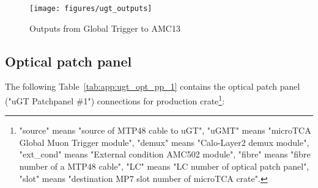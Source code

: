 \begin{figure}[htb]
\centering
\texttt{[image: figures/ugt\_outputs]}
\caption{Outputs from Global Trigger to AMC13}
\label{fig:app:ugt_outputs}
\end{figure}

\clearpage

\subsection{Optical patch panel}\label{sec:app:app_d}

The following Table~\ref{tab:app:ugt_opt_pp_1} contains the optical patch panel ("uGT Patchpanel \#1") connections for production crate\footnote{"source" means "source of MTP48 cable to uGT", "uGMT" means "microTCA Global Muon Trigger module", "demux" means "Calo-Layer2 demux module", "ext\_cond" means "External condition AMC502 module", "fibre" means "fibre number of a MTP48 cable", "LC" means "LC number of optical patch panel", "slot" means "destination MP7 slot number of microTCA crate".\label{note_ugt_opt_pp_1}}:

